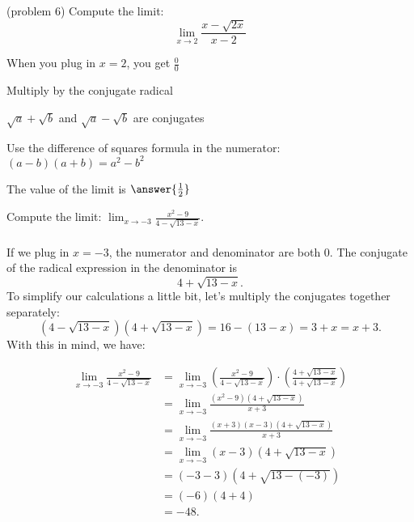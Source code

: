 \documentclass[handout]{ximera}
\begin{document}
\begin{problem}(problem 6)
  Compute the limit:
  \[
  \lim_{x \to 2} \frac{x- \sqrt{2x}}{x-2}
  \]
  
    \begin{hint}
      When you plug in $x = 2$, you get $\frac00$
    \end{hint}
    \begin{hint}
      Multiply by the conjugate radical
    \end{hint}
    \begin{hint}
      $\sqrt a + \sqrt b$ and $\sqrt a - \sqrt b$ are conjugates
    \end{hint}
    \begin{hint}
      Use the difference of squares formula in the numerator: $(a-b)(a+b) = a^2 - b^2$ 
    \end{hint}
    
		The value of the limit is
		 $\answer{\frac12}$
		
\end{problem}



\begin{example}[example 7]
Compute the limit: $\displaystyle{\lim_{x \to -3} \frac{x^2 - 9}{4 - \sqrt{13 -x}}}$.\\
\\
If we plug in $x = -3$, the numerator and denominator are both 0. The conjugate of the radical expression in the denominator is
\[ 4 + \sqrt{13 -x}.\]
To simplify our calculations a little bit, let's multiply the conjugates together separately:
\[(4 - \sqrt{13 -x})(4 + \sqrt{13 -x}) = 16 - (13-x) = 3+x = x+3.\]
With this in mind, we have:

\begin{align*}
\lim_{x \to -3} \frac{x^2 - 9}{4 - \sqrt{13 -x}} &= 
\lim_{x \to -3} \left(\frac{x^2 - 9}{4 - \sqrt{13 -x}}\right) \cdot \left(\frac{4 + \sqrt{13 -x}}{4 + \sqrt{13 -x}}\right) \\[.4 em]
&=\lim_{x \to -3} \frac{(x^2 - 9)\left(4 + \sqrt{13 -x}\right)}{x+3}\\[.4 em]
&=\lim_{x \to -3} \frac{(x+3)(x-3)\left(4 + \sqrt{13 -x}\right)}{x+3} \\[.4 em]
&= \lim_{x \to -3} (x-3)\left(4 + \sqrt{13 -x}\right)\\[.4 em]
&= (-3-3)\left(4 + \sqrt{13- (-3)}\right) \\[.4 em]
&= (-6)(4 + 4) \\[.4 em]
&= -48.
\end{align*}
\end{example}
\end{document}
